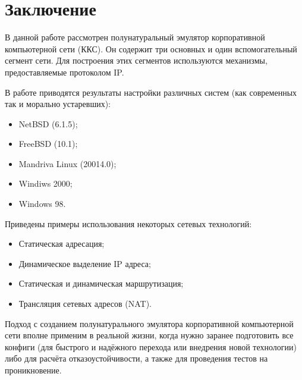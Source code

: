 \documentclass[a4paper, 12pt]{article}		%
\begin{document}

\tableofcontents








\newpage
\section*{Заключение}

В данной работе рассмотрен полунатуральный эмулятор корпоративной компьютерной сети (ККС). Он содержит три основных и один вспомогательный сегмент сети. Для построения этих сегментов используются механизмы, предоставляемые протоколом IP.

В работе приводятся результаты настройки различных систем (как современных так и морально устаревших):
\begin{itemize}
\item NetBSD (6.1.5);
\item FreeBSD (10.1);
\item Mandriva Linux (20014.0);
\item Windiws 2000;
\item Windows 98.
\end{itemize}

Приведены примеры использования некоторых сетевых технологий:
\begin{itemize}
\item Статическая адресация;
\item Динамическое выделение IP адреса;
\item Статическая и динамическая маршрутизация;
\item Трансляция сетевых адресов (NAT).
\end{itemize}

Подход с созданием полунатурального эмулятора корпоративной компьютерной сети вполне применим в реальной жизни, когда нужно заранее подготовить все конфиги (для быстрого и надёжного перехода или внедрения новой технологии) либо для расчёта отказоустойчивости, а также для проведения тестов на проникновение.
\end{document}
